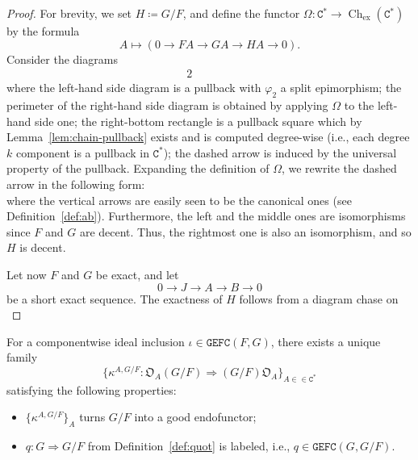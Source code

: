 \documentclass[10pt]{simplearticle}
\newcommand{\tikzinput}[1]{}
\newcommand{\GEFC}{\mathbb{\mathtt{GEFC}}}
\newcommand{\Cstar}{\mathtt{C^{*}}}
\newcommand{\Ch}{\operatorname{Ch}}
\newcommand{\chex}{\Ch_{\operatorname{ex}}}
\begin{document}
\begin{proof}
For brevity, we set $H\coloneqq G/F$, and define the functor $\Omega\colon\Cstar\to\chex(\Cstar)$
by the formula
\[
A\mapsto(0\to FA\to GA\to HA\to0).
\]
Consider the diagrams
\begin{alignat*}{2}
\tikzinput{d172} & \qquad & \tikzinput{d168}
\end{alignat*}
where the left-hand side diagram is a pullback with $\varphi_{2}$
a split epimorphism; the perimeter of the right-hand side diagram
is obtained by applying $\Omega$ to the left-hand side one; the right-bottom
rectangle is a pullback square which by Lemma~\ref{lem:chain-pullback}
exists and is computed degree-wise (i.e., each degree $k$ component
is a pullback in $\Cstar$); the dashed arrow is induced by the universal
property of the pullback. Expanding the definition of $\Omega$, we
rewrite the dashed arrow in the following form:
\[
\tikzinput{d173}
\]
where the vertical arrows are easily seen to be the canonical ones
(see Definition~\ref{def:ab}). Furthermore, the left and the middle
ones are isomorphisms since $F$ and $G$ are decent. Thus, the rightmost
one is also an isomorphism, and so $H$ is decent.

Let now $F$ and $G$ be exact, and let
\[
0\to J\to A\to B\to0
\]
 be a short exact sequence. The exactness of $H$ follows from a diagram
chase on
\[
\tikzinput{d476}
\]
\end{proof}

\begin{lem}\label{lem:quotient-criterion}
For a componentwise ideal inclusion
$\iota\in\GEFC(F,G)$, there exists a unique family
\[
\{\kappa^{A,G/F}\colon\mathfrak{O}_{A}(G/F)\Rightarrow(G/F)\mathfrak{O}_{A}\}_{A\in\in\Cstar}
\]
 satisfying the following properties:
\begin{itemize}
\item $\{\kappa^{A,G/F}\}_{A}$ turns $G/F$ into a good endofunctor;
\item $q\colon G\Rightarrow G/F$ from Definition~\ref{def:quot} is labeled,
i.e., $q\in\GEFC(G,G/F)$.
\end{itemize}
\end{lem}
\end{document}
